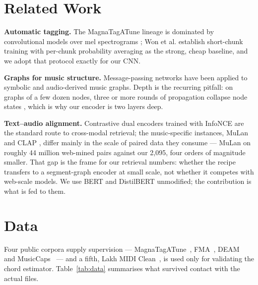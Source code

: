 \documentclass[conference]{IEEEtran}
\newcommand{\MCTrain}{2{,}095}
\begin{document}
\section{Related Work}
\textbf{Automatic tagging.} The MagnaTagATune lineage \cite{law2009mtat} is
dominated by convolutional models over mel spectrograms
\cite{choi2016fcn}; Won et al. \cite{won2020eval} establish short-chunk
training with per-chunk probability averaging as the strong, cheap baseline,
and we adopt that protocol exactly for our CNN.

\textbf{Graphs for music structure.} Message-passing networks
\cite{hamilton2017sage,brody2022gatv2} have been applied to symbolic and
audio-derived music graphs. Depth is the recurring pitfall: on graphs of a few
dozen nodes, three or more rounds of propagation collapse node states
\cite{li2018deeper}, which is why our encoder is two layers deep.

\textbf{Text--audio alignment.} Contrastive dual encoders
\cite{radford2021clip} trained with InfoNCE \cite{oord2018cpc} are the standard
route to cross-modal retrieval; the music-specific instances, MuLan
\cite{huang2022mulan} and CLAP \cite{elizalde2023clap}, differ mainly in the
scale of paired data they consume --- MuLan on roughly 44 million web-mined
pairs against our \MCTrain{}, four orders of magnitude smaller. That gap is the
frame for our retrieval numbers: whether the recipe transfers to a
segment-graph encoder at small scale, not whether it competes with web-scale
models. We use BERT \cite{devlin2019bert} and DistilBERT
\cite{sanh2019distilbert} unmodified; the contribution is what is fed to them.

\section{Data}
Four public corpora supply supervision --- MagnaTagATune~\cite{law2009mtat},
FMA~\cite{defferrard2017fma}, DEAM~\cite{aljanaki2017deam} and
MusicCaps~\cite{agostinelli2023musiclm} --- and a fifth, Lakh MIDI
Clean~\cite{raffel2016lakh}, is used only for validating the chord estimator. Table~\ref{tab:data} summarises what survived contact with
the actual files.

\end{document}
